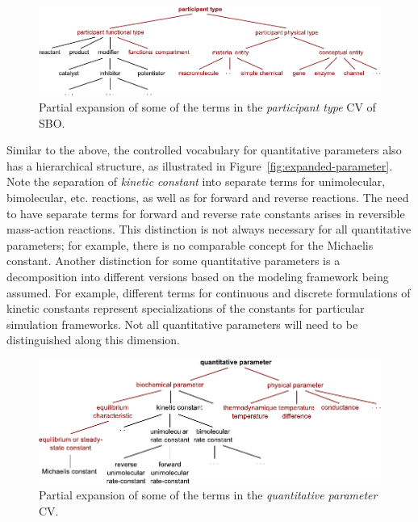 \begin{figure}[htb]
  \vspace*{1ex}
  \centering
  \includegraphics[scale = 0.9]{figs/sbo-participant-type}
  \caption{Partial expansion of some of the terms in the
    \emph{participant type} CV of SBO.}
  \label{fig:expanded-species}
\end{figure}

Similar to the above, the controlled vocabulary for quantitative
parameters also has a hierarchical structure, as illustrated in
Figure~\vref{fig:expanded-parameter}.  Note the separation of
\emph{kinetic constant} into separate terms for unimolecular,
bimolecular, etc. reactions, as well as for forward and
reverse reactions.  The need to have separate terms for forward
and reverse rate constants arises in reversible mass-action
reactions.  This distinction is not always necessary for all
quantitative parameters; for example, there is no comparable
concept for the Michaelis constant.  Another distinction for some
quantitative parameters is a decomposition into different versions
based on the modeling framework being assumed.  For example,
different terms for continuous and discrete formulations of
kinetic constants represent specializations of the constants for
particular simulation frameworks.  Not all quantitative parameters
will need to be distinguished along this dimension.

\begin{figure}[tbh]
  \vspace*{2ex}
  \centering
  \includegraphics[scale = 0.9]{figs/sbo-quantitative-parameter}
  \caption{Partial expansion of some of the terms in the \emph{quantitative
      parameter} CV.}
  \label{fig:expanded-parameter}
\end{figure}

